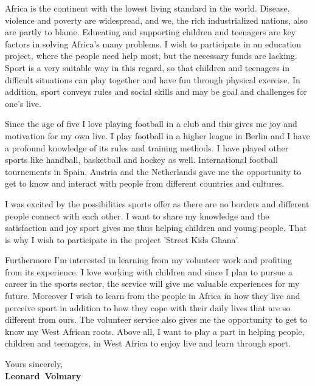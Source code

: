 \documentclass[11pt,a4paper]{article}
\def\firstname{Leonard}
\def\familyname{Volmary}
\begin{document}
Africa is the continent with the lowest living standard in the world. Disease, violence and poverty are widespread, and we, the rich industrialized nations, also are partly to blame. Educating and supporting children and teenagers are key factors in solving Africa's many problems. I wish to participate in an education project, where the people need help most, but the necessary funds are lacking. Sport is a very suitable way in this regard, so that children and teenagers in difficult situations can play together and have fun through physical exercise. In addition, sport conveys rules and social skills and may be goal and challenges for one's live.

Since the age of five I love playing football in a club and this gives me joy and motivation for my own live. I play football in a higher league in Berlin and I have a profound knowledge of its rules and training methods. I have played other sports like handball, basketball and hockey as well. International football tournements in Spain, Austria and the Netherlands gave me the opportunity to get to know and interact with people from different countries and cultures. 

I was excited by the possibilities sports offer as there are no borders and different people connect with each other. I want to share my knowledge and the satisfaction and joy sport gives me thus helping children and young people. That is why I wish to participate in the project 'Street Kids Ghana'. 

Furthermore I'm interested in learning from my volunteer work and profiting from its experience. I love working with children and since I plan to pursue a career in the sports sector, the service will give me valuable experiences for my future. Moreover I wish to learn from the people in Africa in how they live and perceive sport in addition to how they cope with their daily lives that are so different from ours. The volunteer service also gives me the opportunity to get to know my West African roots. Above all, I want to play a part in helping people, children and teenagers, in West Africa to enjoy live and learn through sport. 

  
Yours sincerely,\\[2em] %
%
{\bfseries \firstname~\familyname}\\
%
\end{document}

